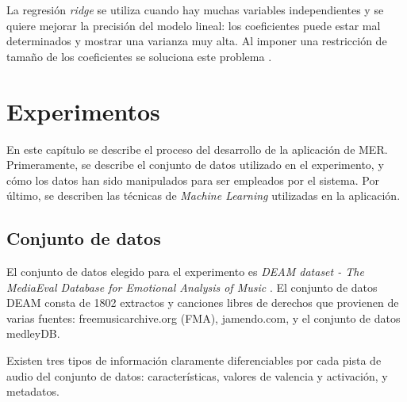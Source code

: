 \documentclass[12pt,a4paper,Spanish]{article}
\begin{document}
La regresión \textit{ridge} se utiliza cuando hay muchas variables independientes y se quiere mejorar la precisión del modelo lineal: los coeficientes puede estar mal determinados y mostrar una varianza muy alta. Al imponer una restricción de tamaño de los coeficientes se soluciona este problema \cite{fahrmeir2013regression}.










\newpage
\section{Experimentos}
En este capítulo se describe el proceso del desarrollo de la aplicación de MER. Primeramente, se describe el conjunto de datos utilizado en el experimento, y cómo los datos han sido manipulados para ser empleados por el sistema. Por último, se describen las técnicas de \textit{Machine Learning} utilizadas en la aplicación.


\subsection{Conjunto de datos}
El conjunto de datos elegido para el experimento es \textit{DEAM dataset - The MediaEval Database for Emotional Analysis of Music} \cite{AlajankiEmoInMusicAnalysis}. El conjunto de datos DEAM consta de 1802 extractos y canciones libres de derechos que provienen de varias fuentes: freemusicarchive.org (FMA), jamendo.com,
y el conjunto de datos medleyDB.
\newline

Existen tres tipos de información claramente diferenciables por cada pista de audio del conjunto de datos: características, valores de valencia y activación, y metadatos.
\end{document}

